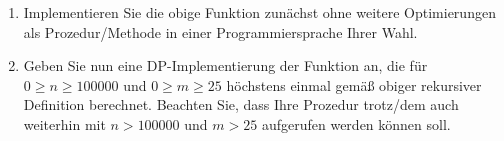\documentclass{lehramt-informatik}
\begin{document}
\begin{enumerate}
\item Implementieren Sie die obige Funktion  zunächst ohne
weitere Optimierungen als Prozedur/Methode in einer Programmiersprache
Ihrer Wahl.

\begin{antwort}
\end{antwort}

\item Geben Sie nun eine DP-Implementierung der Funktion 
an, die  für $0 \geq n \geq 100000$ und $0 \geq m \geq 25$
höchstens einmal gemäß obiger rekursiver Definition berechnet. Beachten
Sie, dass Ihre Prozedur trotz/dem auch weiterhin mit $n > 100000$ und $m
> 25$ aufgerufen werden können soll.

\begin{antwort}
\end{antwort}
\end{enumerate}

\literatur
\end{document}
